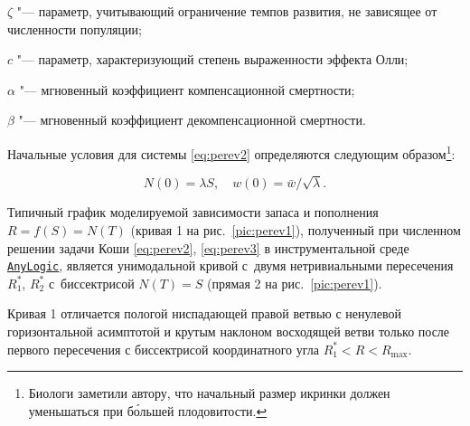 $\zeta$ "--- параметр, учитывающий ограничение темпов развития, не зависящее от численности популяции; 

$c$ "--- параметр, характеризующий степень выраженности эффекта Олли; 

$\alpha$ "--- мгновенный коэффициент компенсационной смертности; 

$\beta$ "--- мгновенный коэффициент декомпенсационной смертности. 

Начальные условия для системы  \eqref{eq:perev2} определяются следующим образом\footnote{Биологи заметили автору, что начальный размер икринки должен уменьшаться при б\'ольшей плодовитости.}\!\!:

\begin{equation}

\label{eq:perev3}

N(0)=\lambda S,\quad w(0)=\bar w/\sqrt{\lambda}.

\end{equation}





Типичный график  моделируемой зависимости запаса и пополнения $R=f(S)=N(T)$ (кривая 1 на рис.~\ref{pic:perev1}), полученный при численном решении задачи Коши \eqref{eq:perev2}, \eqref{eq:perev3} в инструментальной среде \href{http://www.anylogic.com/}{\tt AnyLogic}, является унимодальной кривой с~двумя нетривиальными пересечения $R_1^*$, $R_2^*$ с~биссектрисой $N(T)=S$ (прямая 2 на рис.~\ref{pic:perev1}).  

Кривая 1 отличается пологой ниспадающей правой ветвью с ненулевой горизонтальной асимптотой и крутым наклоном восходящей ветви только после первого пересечения с биссектрисой координатного угла $R_1^*<R<R_{\max}.$ 





